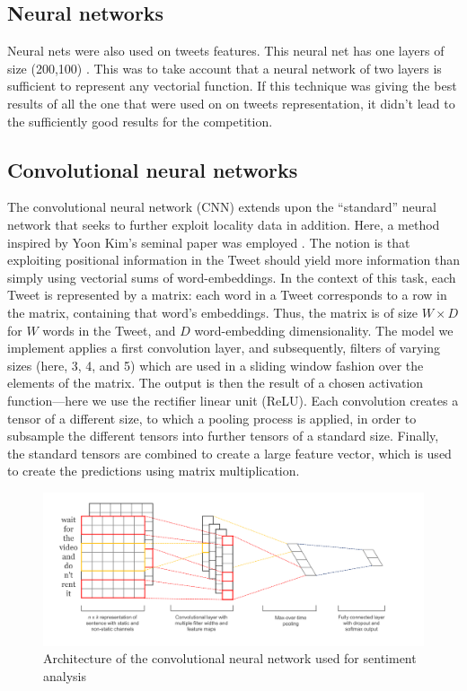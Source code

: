 \subsection{Neural networks}

Neural nets were also used on tweets features. This neural net has one layers of size (200,100) . This was to take account that a neural network of  two layers is sufficient to represent any vectorial function.  If this technique was giving the best results of all the one that were used on on tweets representation, it didn't lead to the sufficiently good results for the competition. 

\subsection{Convolutional neural networks}
The convolutional neural network (CNN) extends upon the ``standard'' neural network that seeks to further exploit locality data in addition. Here, a method inspired by Yoon Kim's seminal paper was employed \cite{cnnYoon}. The notion is that exploiting positional information in the Tweet should yield more information than simply using vectorial sums of word-embeddings.
In the context of this task, each Tweet is represented by a matrix: each word in a Tweet corresponds to a row in the matrix, containing that word's embeddings. Thus, the matrix is of size $W \times D$ for $W$ words in the Tweet, and $D$ word-embedding dimensionality.
The model we implement applies a first convolution layer, and subsequently, filters of varying sizes (here, 3, 4, and 5) which are used in a sliding window fashion over the elements of the matrix. The output is then the result of a chosen activation function---here we use the rectifier linear unit (ReLU). Each convolution creates a tensor of a different size, to which a pooling process is applied, in order to subsample the different tensors into further tensors of a standard size. Finally, the standard tensors are combined to create a large feature vector, which is used to create the predictions using matrix multiplication.

\begin{figure}[h!]
\centering
	\includegraphics[scale=0.2]{CNN} 
\caption{Architecture of the convolutional neural network used for sentiment analysis \cite{cnnYoon}}
\label{plot:CNN}
\end{figure}
\FloatBarrier

